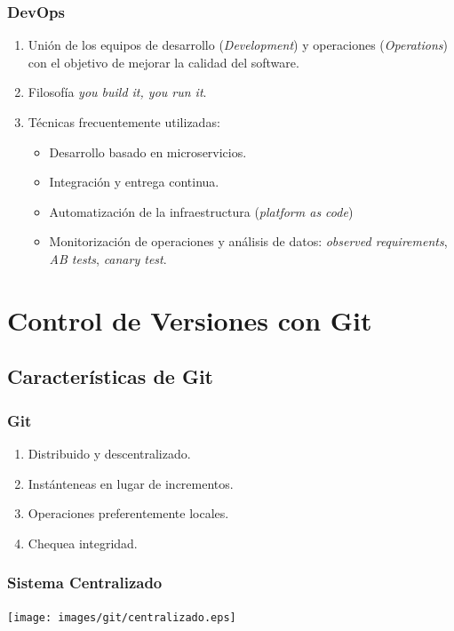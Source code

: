 \documentclass[animated,a4paper,slidestop,xcolor=pst,blue]{beamer}
\begin{document}
\begin{frame}[c]
	\frametitle{DevOps}
	\begin{enumerate}[<+->]
	   \item Unión de los equipos de desarrollo (\emph{Development}) y operaciones (\emph{Operations}) con el objetivo de mejorar la calidad del software.
       \item Filosofía \emph{you build it, you run it}.
       \item Técnicas frecuentemente utilizadas:
            \begin{itemize}
                \item Desarrollo basado en microservicios.
                \item Integración y entrega continua.
                \item Automatización de la infraestructura (\emph{platform as code})
                \item Monitorización de operaciones y análisis de datos: \emph{observed requirements}, \emph{AB tests}, \emph{canary test}.
            \end{itemize}
    \end{enumerate}	
\end{frame}

\section{Control de Versiones con Git}

\subsection{Características de Git}

\begin{frame}[c]
	\frametitle{Git}
	 \begin{enumerate}[<+->]
        \item Distribuido y descentralizado.
        \item Instánteneas en lugar de incrementos.
        \item Operaciones preferentemente locales.
        \item Chequea integridad.
	 \end{enumerate}
\end{frame}

\begin{frame}[c]
	\frametitle{Sistema Centralizado}
	 \begin{center}
		\texttt{[image: images/git/centralizado.eps]}
	 \end{center}
\end{frame}
\end{document}
